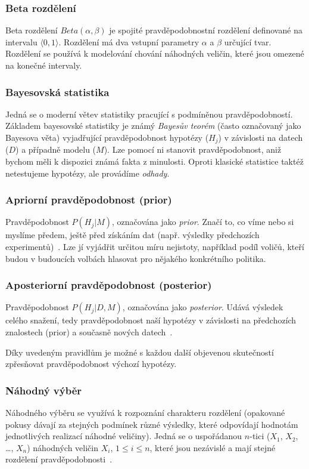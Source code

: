 \documentclass[thesis=M,czech]{FITthesis}[2014/05/07]
\begin{document}
\subsubsection{Beta rozdělení}
\label{beta}
Beta rozdělení ${Beta}(\alpha, \beta)$ je spojité pravděpodobnostní rozdělení definované na intervalu $\langle0,1\rangle$. Rozdělení má dva vstupní parametry $\alpha$ a $\beta$ určující tvar. Rozdělení se používá k modelování chování náhodných veličin, které jsou omezené na konečné intervaly. 

\subsubsection{Bayesovská statistika}
Jedná se o moderní větev statistiky pracující s podmíněnou pravděpodobností. Základem bayesovské statistiky je známý \emph{Bayesův teorém} (často označovaný jako Bayesova věta) vyjadřující pravděpodobnost hypotézy ($H_j$) v závislosti na datech ($D$) a případně modelu ($M$). Lze pomocí ni stanovit pravděpodobnost, aniž bychom měli k dispozici známá fakta z minulosti. Oproti klasické statistice taktéž netestujeme hypotézy, ale provádíme \emph{odhady}. 

\subsubsection{Apriorní pravděpodobnost (prior)}
\label{prior}
Pravděpodobnost $P(H_j | M)$, označována jako \emph{prior}. Značí to, co víme nebo si myslíme předem, ještě před získáním dat (např. výsledky předchozích experimentů)~\cite{pst4}. Lze jí vyjádřit určitou míru nejistoty, například podíl voličů, kteří budou v budoucích volbách hlasovat pro nějakého konkrétního politika. 

\subsubsection{Aposteriorní pravděpodobnost (posterior)}
\label{poster}
Pravděpodobnost $P(H_j | D, M)$, označována jako \emph{posterior}. Udává výsledek celého snažení, tedy pravděpodobnost naší hypotézy v závislosti na předchozích znalostech (prior) a současně nových datech~\cite{pst4}.

Díky uvedeným pravidlům je možné s každou další objevenou skutečností zpřesňovat pravděpodobnost výchozí hypotézy. 

\subsubsection{Náhodný výběr}
\label{randomvyber}
Náhodného výběru se využívá k rozpoznání charakteru rozdělení (opakované pokusy dávají za stejných podmínek různé výsledky, které odpovídají hodnotám jednotlivých realizací náhodné veličiny). Jedná se o uspořádanou $n$-tici ($X_1$, $X_2$, \ldots, $X_n$) náhodných veličin $X_i$, $1 \leq i \leq n$, které jsou nezávislé a mají stejné rozdělení pravděpodobnosti~\cite{pst3}.
\end{document}
